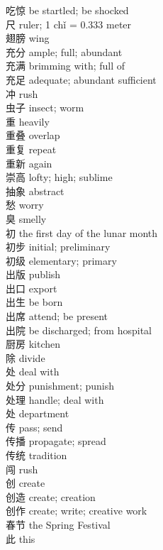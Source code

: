 吃惊 \quad be startled; be shocked\\
尺 \quad ruler; 1 chǐ = 0.333 meter\\
翅膀 \quad wing\\
充分 \quad ample; full; abundant\\
充满 \quad brimming with; full of\\
充足 \quad adequate; abundant sufficient\\
冲 \quad rush\\
虫子 \quad insect; worm\\
重 \quad heavily\\
重叠 \quad overlap\\
重复 \quad repeat\\
重新 \quad again\\
崇高 \quad lofty; high; sublime\\
抽象 \quad abstract\\
愁 \quad worry\\
臭 \quad smelly\\
初 \quad the first day of the lunar month\\
初步 \quad initial; preliminary\\
初级 \quad elementary; primary\\
出版 \quad publish\\
出口 \quad export\\
出生 \quad be born\\
出席 \quad attend; be present\\
出院 \quad be discharged; from hospital\\
厨房 \quad kitchen\\
除 \quad divide\\
处 \quad deal with\\
处分 \quad punishment; punish\\
处理 \quad handle; deal with\\
处 \quad department\\
传 \quad pass; send\\
传播 \quad propagate; spread\\
传统 \quad tradition\\
闯 \quad rush\\
创 \quad create\\
创造 \quad create; creation\\
创作 \quad create; write; creative work\\
春节 \quad the Spring Festival\\
此 \quad this\\
